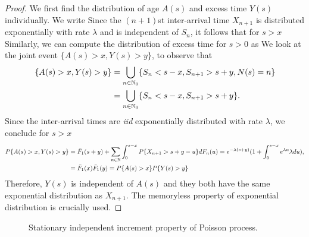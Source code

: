 \documentclass[a4paper,10pt,english]{article}
\begin{document}
\begin{proof} 
We first find the distribution of age $A(s)$ and excess time $Y(s)$ individually. 
We write 
Since the $(n+1)$st inter-arrival time $X_{n+1}$ is distributed exponentially with rate $\lambda$ and is independent of $S_{n}$, it follows that for $s > x$ 
Similarly, we can compute the distribution of excess time for $s > 0$ as 
We look at the joint event $\{A(s) > x, Y(s) > y\}$, to observe  that 
\begin{align*}
\{A(s) > x, Y(s)> y\} %
&= \bigcup_{n \in \N_0}\{ S_n <  s -x , S_{n+1} > s + y, N(s) = n\}\\
&= \bigcup_{n \in \N_0}\{ S_n <  s -x , S_{n+1} > s + y\}.
\end{align*}
Since the inter-arrival times are \textit{iid} exponentially distributed with rate $\lambda$, we conclude for $s > x$
\begin{align*}
P\{A(s)> x, Y(s) > y\} &= \bar{F}_1(s+y) + \sum_{n \in \mathbb{N}}\int_{0}^{s-x}P\{X_{n+1} > s + y - u \}dF_n(u)
= e^{-\lambda (s+y)}(1 + \int_{0}^{s-x}e^{\lambda u}\lambda du),\\
&= \bar{F}_1(x)\bar{F}_1(y) = P\{A(s) > x\}P\{Y(s) > y\}
\end{align*}
Therefore,  $Y(s)$ is independent of $A(s)$ and they both have the same exponential distribution as $X_{n+1}$. 
The memoryless property of exponential distribution is crucially used. 
\end{proof}

\begin{figure}[hhhh]
\center
	
  	\caption{Stationary independent increment property of Poisson process.}
	\label{Fig:IndependentIncrements}
\end{figure}
\end{document}
